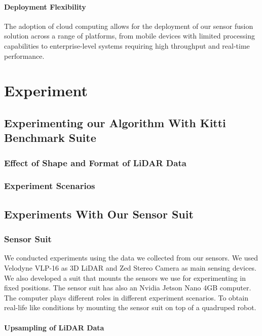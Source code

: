 \documentclass[conference]{IEEEtran}
\begin{document}
\paragraph{Deployment Flexibility} The adoption of cloud computing allows for the deployment of our sensor fusion solution across a range of platforms, from mobile devices with limited processing capabilities to enterprise-level systems requiring high throughput and real-time performance.

\section{Experiment}

\subsection{Experimenting our Algorithm With Kitti Benchmark Suite}

\subsubsection{Effect of Shape and Format of LiDAR Data}
\subsubsection{Experiment Scenarios}

\subsection{Experiments With Our Sensor Suit}

\subsubsection{Sensor Suit}
We conducted experiments using the data we collected from our sensors. We used Velodyne VLP-16 as 3D LiDAR and Zed Stereo Camera as main sensing devices. We also developed a suit that mounts the sensors we use for experimenting in fixed positions. The sensor suit has also an Nvidia Jetson Nano 4GB computer. The computer plays different roles in different experiment scenarios.
To obtain real-life like conditions by mounting the sensor suit on top of a quadruped robot. 
\paragraph{Upsampling of LiDAR Data}
\end{document}
